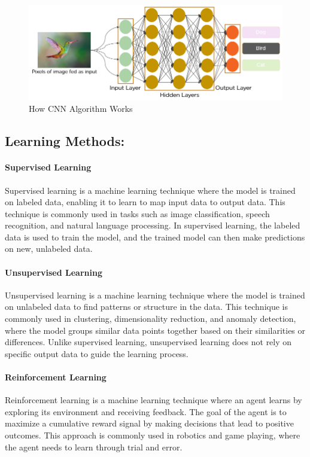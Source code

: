 		\begin{figure}[h]
			\centering
			\includegraphics[width=0.8\linewidth]{images chap1/cnnimage.png}
			\caption{How CNN Algorithm Works}
			\label{cnnimage}
		\end{figure}
		
		
		
		\subsection{Learning Methods: }
			\paragraph{Supervised Learning}
			Supervised learning is a machine learning technique where the model is trained on labeled data, enabling it to learn to map input data to output data. This technique is commonly used in tasks such as image classification, speech recognition, and natural language processing. In supervised learning, the labeled data is used to train the model, and the trained model can then make predictions on new, unlabeled data. \cite{alpaydin2010introduction}
		
			\paragraph{Unsupervised Learning}
			Unsupervised learning is a machine learning technique where the model is trained on unlabeled data to find patterns or structure in the data. This technique is commonly used in clustering, dimensionality reduction, and anomaly detection, where the model groups similar data points together based on their similarities or differences. Unlike supervised learning, unsupervised learning does not rely on specific output data to guide the learning process. \cite{goodfellow2016deep}
			\paragraph{Reinforcement Learning}
			Reinforcement learning is a machine learning technique where an agent learns by exploring its environment and receiving feedback. The goal of the agent is to maximize a cumulative reward signal by making decisions that lead to positive outcomes. This approach is commonly used in robotics and game playing, where the agent needs to learn through trial and error. \cite{sutton2018reinforcement}
